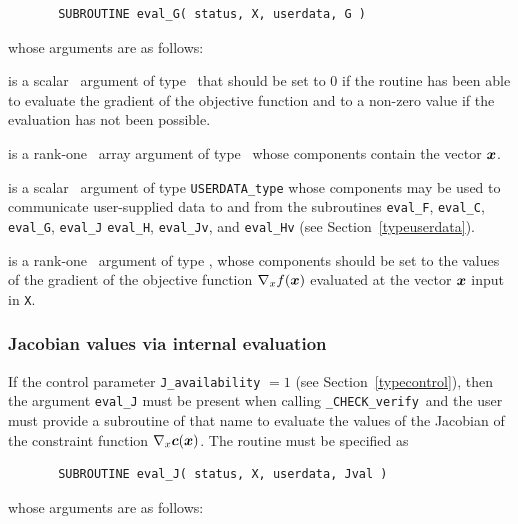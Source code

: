\documentclass{galahad}
\newcommand{\packagename}{CHECK}
\newcommand{\fullpackagename}{\libraryname\_\packagename}
\newcommand{\solver}{{\tt \fullpackagename\_verify}}
\begin{document}
\def\baselinestretch{0.8}
{\tt \begin{verbatim}
       SUBROUTINE eval_G( status, X, userdata, G ) \end{verbatim} }
\def\baselinestretch{1.0}
\noindent whose arguments are as follows:

\begin{description}
 is a scalar \intentout\ argument of type \integer\
that should be set to 0 if the routine has been able to evaluate
the gradient of the objective function
and to a non-zero value if the evaluation has not been possible.

 is a rank-one \intentin\ array argument of type \realdp\
whose components contain the vector ${\bm{x}}$.

 is a scalar \intentinout\ argument of type 
{\tt USERDATA\_type} whose components may be used
to communicate user-supplied data to and from the
subroutines {\tt eval\_F}, {\tt eval\_C}, {\tt eval\_G}, {\tt eval\_J}
{\tt eval\_H}, {\tt eval\_Jv}, and {\tt eval\_Hv} 
(see Section~\ref{typeuserdata}).

 is a rank-one \intentout\ argument of type \realdp,
whose components should be set to the values of the gradient 
of the objective function $\nabla_x f({\bm{x}})$
evaluated at the vector ${\bm{x}}$ input in {\tt X}.

\end{description}


\subsubsection{Jacobian values via internal evaluation\label{jfv}}

If the control parameter {\tt J\_availability} $=1$ (see
Section~\ref{typecontrol}), then the argument {\tt eval\_J} must be
present when calling \solver\ and the
user must provide a subroutine of that name to evaluate the
values of the Jacobian of the constraint function $\nabla_x {\bm{c}}({\bm{x}})$.
The routine must be specified as

\def\baselinestretch{0.8}
{\tt \begin{verbatim}
       SUBROUTINE eval_J( status, X, userdata, Jval ) \end{verbatim} }
\def\baselinestretch{1.0}
\noindent whose arguments are as follows:
\end{document}
